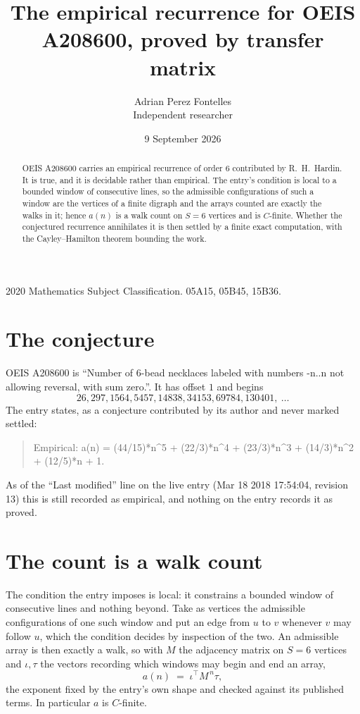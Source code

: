 \documentclass[11pt,a4paper]{article}
\title{The empirical recurrence for OEIS A208600, proved by transfer matrix}
\author{Adrian Perez Fontelles\\ \small Independent researcher}
\date{9 September 2026}
\theoremstyle{plain}
\theoremstyle{definition}
\begin{document}
\maketitle

\begin{abstract}
OEIS A208600 carries an empirical recurrence of order $6$ contributed by R.~H.~Hardin. It is
true, and it is decidable rather than empirical. The entry's condition is local to a bounded window of consecutive lines, so
the admissible configurations of such a window are the vertices of a finite digraph and the
arrays counted are exactly the walks in it; hence $a(n)$ is a walk count on $S=6$ vertices
and is $C$-finite. Whether the conjectured recurrence annihilates it is then settled by a
finite exact computation, with the Cayley--Hamilton theorem bounding the work.
\end{abstract}

\noindent\small 2020 Mathematics Subject Classification. 05A15, 05B45, 15B36.\normalsize

\section{The conjecture}

OEIS A208600 is ``Number of 6-bead necklaces labeled with numbers -n..n not allowing reversal, with sum zero.''. It has offset $1$ and begins
\[
26, 297, 1564, 5457, 14838, 34153, 69784, 130401,\ \dots
\]
The entry states, as a conjecture contributed by its author and never marked settled:
\begin{quote}
Empirical: a(n) = (44/15)*n\^{}5 + (22/3)*n\^{}4 + (23/3)*n\^{}3 + (14/3)*n\^{}2 + (12/5)*n + 1.
\end{quote}
As of the ``Last modified'' line on the live entry (Mar 18 2018 17:54:04, revision 13) this is still
recorded as empirical, and nothing on the entry records it as proved.

\section{The count is a walk count}

The condition the entry imposes is local: it constrains a bounded window of consecutive lines and nothing beyond. Take as
vertices the admissible configurations of one such window and put an edge from $u$ to $v$
whenever $v$ may follow $u$, which the condition decides by inspection of the two. An
admissible array is then exactly a walk, so with $M$ the adjacency matrix on $S=6$ vertices
and $\iota,\tau$ the vectors recording which windows may begin and end an array,
\[
a(n)\;=\;\iota^{\!\top}M^{\,n}\tau ,
\]
the exponent fixed by the entry's own shape and checked against its published terms. In
particular $a$ is $C$-finite.
\end{document}
